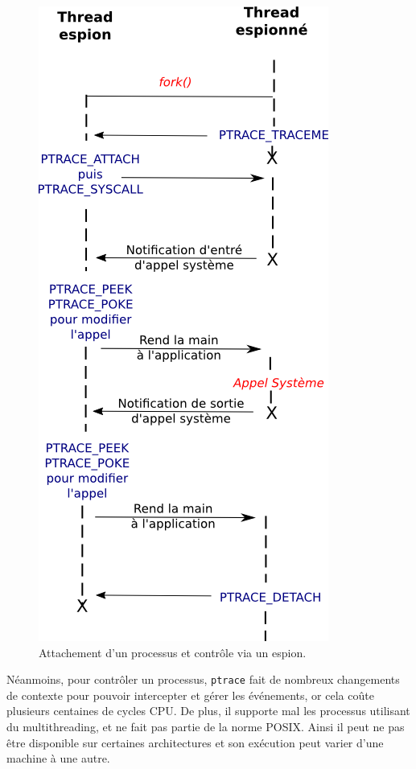 \begin{figure}
\centering
\includegraphics[scale=0.5]{Pictures/png/ptrace_fonctionnement}
\caption{Attachement d'un processus et contrôle via un espion.}
\label{PTRACE_FONCTIONNEMENT}
\end{figure}

Néanmoins, pour contrôler un processus, \texttt{ptrace} fait de nombreux
changements de contexte pour pouvoir intercepter et gérer les événements, or
cela coûte plusieurs centaines de cycles CPU. De plus, il supporte mal
les processus utilisant du multithreading, et ne fait pas partie de la norme
POSIX. Ainsi il peut ne pas être disponible sur certaines architectures et son
exécution peut varier d'une machine à une autre.

